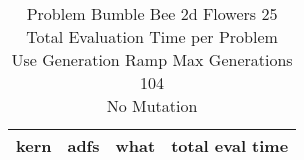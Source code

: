 \begin{table}[H]
\caption{Problem  Bumble Bee 2d  Flowers 25\\Total Evaluation Time per Problem \\ Use Generation Ramp  Max Generations 104\\ No Mutation \\}
\begin{center}
\scalebox{1.0} %
{
\begin{tabular}{lllr}
\hline
kern & adfs & what & total eval time \\
\hline


\end{tabular}
}
\end{center}
\end{table}

